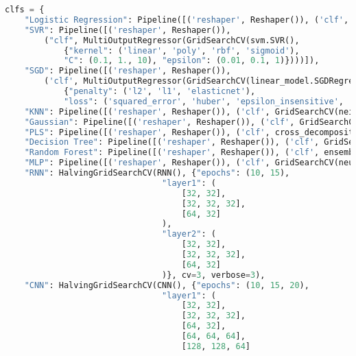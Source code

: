 \begin{lstlisting}[label=python-listing,caption={Kod źródłowy},language=python]
clfs = {
    "Logistic Regression": Pipeline([('reshaper', Reshaper()), ('clf', MultiOutputRegressor(GridSearchCV(linear_model.Ridge(), {"solver": ('svd', 'cholesky', 'lsqr', 'sparse_cg', 'sag', 'saga', 'lbfgs')})))]),
    "SVR": Pipeline([('reshaper', Reshaper()), 
        ("clf", MultiOutputRegressor(GridSearchCV(svm.SVR(), 
            {"kernel": ('linear', 'poly', 'rbf', 'sigmoid'), 
            "C": (0.1, 1., 10), "epsilon": (0.01, 0.1, 1)})))]),
    "SGD": Pipeline([('reshaper', Reshaper()), 
        ('clf', MultiOutputRegressor(GridSearchCV(linear_model.SGDRegressor(), 
            {"penalty": ('l2', 'l1', 'elasticnet'), 
            "loss": ('squared_error', 'huber', 'epsilon_insensitive', 'squared_epsilon_insensitive')})))]),
    "KNN": Pipeline([('reshaper', Reshaper()), ('clf', GridSearchCV(neighbors.KNeighborsRegressor(), {"weights": ("unifor", "distance"), "algorithm": ('ball_tree', 'kd_tree', 'brute'), "p": (1, 2, 3, 4)}))]),
    "Gaussian": Pipeline([('reshaper', Reshaper()), ('clf', GridSearchCV(gaussian_process.GaussianProcessRegressor(normalize_y=True), {"alpha": (1e-10, 1e-5, .01, .1), "n_restarts_optimizer": (0, 1, 2, 3, 4)}))]),
    "PLS": Pipeline([('reshaper', Reshaper()), ('clf', cross_decomposition.PLSRegression())]),
    "Decision Tree": Pipeline([('reshaper', Reshaper()), ('clf', GridSearchCV(tree.DecisionTreeRegressor(), {"splitter": ("best", "random"), "min_samples_leaf": (1, 2, 3, 4), "max_depth": (None, 5, 10, 15, 20)}))]),
    "Random Forest": Pipeline([('reshaper', Reshaper()), ('clf', ensemble.RandomForestRegressor())]),
    "MLP": Pipeline([('reshaper', Reshaper()), ('clf', GridSearchCV(neural_network.MLPRegressor(), {'activation': ('identity', 'logistic', 'tanh', 'relu'), "solver": ('lbfgs', 'sgd', 'adam')}))]),
    "RNN": HalvingGridSearchCV(RNN(), {"epochs": (10, 15), 
                                "layer1": (
                                    [32, 32],
                                    [32, 32, 32],
                                    [64, 32]
                                ), 
                                "layer2": (
                                    [32, 32],
                                    [32, 32, 32],
                                    [64, 32]
                                )}, cv=3, verbose=3),
    "CNN": HalvingGridSearchCV(CNN(), {"epochs": (10, 15, 20), 
                                "layer1": (
                                    [32, 32],
                                    [32, 32, 32],
                                    [64, 32],
                                    [64, 64, 64],
                                    [128, 128, 64]

\end{lstlisting}
